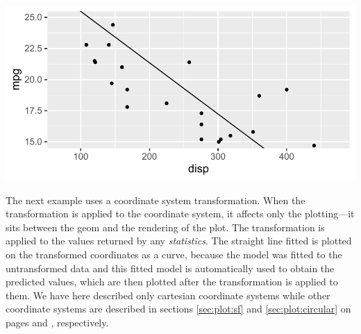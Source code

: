 \documentclass[krantz2]{krantz}\usepackage{knitr}
\begin{document}
\begin{knitrout}\footnotesize
{}\color{fgcolor}\begin{kframe}
\begin{alltt}
\hlstd{(} 
       \hlstd{(}    \hlopt{+}
  \hlstd{()} \hlopt{+}
  \hlstd{(} \hlstd{=} \hlstd{,}  \hlstd{=} \hlstd{,}   \hlopt{~}  \hlopt{+}
  \hlstd{(} \hlstd{=} \hlstd{(}\hlstd{,} \hlstd{))}
\end{alltt}
\end{kframe}

{\centering \includegraphics[width=.7\textwidth]{figure/pos-ggplot-basics-07-1} 

}


\end{knitrout}

The next example uses a coordinate system transformation. When the transformation is applied to the coordinate system, it affects only the plotting---it sits between the geom and the rendering of the plot. The transformation is applied to the values returned by any \emph{statistics}. The straight line fitted is plotted on the transformed coordinates as a curve, because the model was fitted to the untransformed data and this fitted model is automatically used to obtain the predicted values, which are then plotted after the transformation is applied to them. We have here described only cartesian coordinate systems while other coordinate systems are described in sections \ref{sec:plot:sf} and \ref{sec:plot:circular} on pages \pageref{sec:plot:sf} and \pageref{sec:plot:circular}, respectively.
\end{document}

